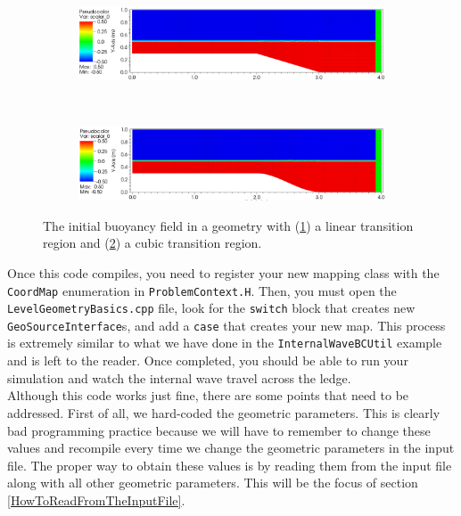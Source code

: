 \documentclass[12pt]{article}
\begin{document}
\begin{figure}
\centering
\begin{subfigure}{\textwidth}
  \centering
  \includegraphics[width=\textwidth]{LedgeMap_ICLinear.png}
  \caption{}
  \label{fig:LedgeMapICLinear}
\end{subfigure}
\\
\begin{subfigure}{\textwidth}
  \centering
  \includegraphics[width=\textwidth]{LedgeMap_ICCubic.png}
  \caption{}
  \label{fig:LedgeMapICCubic}
\end{subfigure}
\caption{The initial buoyancy field in a geometry with (\ref{fig:LedgeMapICLinear}) a linear transition region and (\ref{fig:LedgeMapICCubic}) a cubic transition region.}
\label{fig:LedgeMapICs}
\end{figure}

Once this code compiles, you need to register your new mapping class with the \texttt{CoordMap} enumeration in \texttt{ProblemContext.H}. Then, you must open the \texttt{LevelGeometryBasics.cpp} file, look for the \texttt{switch} block that creates new \texttt{GeoSourceInterface}s, and add a \texttt{case} that creates your new map. This process is extremely similar to what we have done in the \texttt{InternalWaveBCUtil} example and is left to the reader. Once completed, you should be able to run your simulation and watch the internal wave travel across the ledge.\\

Although this code works just fine, there are some points that need to be addressed. First of all, we hard-coded the geometric parameters. This is clearly bad programming practice because we will have to remember to change these values and recompile every time we change the geometric parameters in the input file. The proper way to obtain these values is by reading them from the input file along with all other geometric parameters. This will be the focus of section \ref{HowToReadFromTheInputFile}.\\
\end{document}
